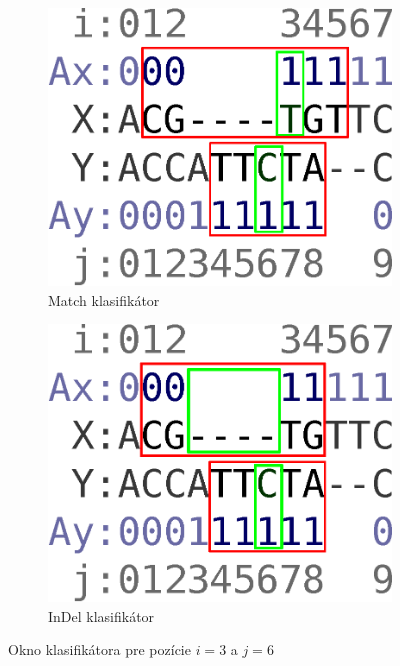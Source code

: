 \begin{figure}[hp]
        \centering
        \begin{subfigure}[b]{0.35\textwidth}
                \includegraphics[width=\textwidth]{images/window_m}
                \caption{Match klasifikátor}
                \label{fig:window-m}
        \end{subfigure}%
        \qquad\qquad %
        \begin{subfigure}[b]{0.35\textwidth}
                \includegraphics[width=\textwidth]{images/window_i}
                \caption{InDel klasifikátor}
                \label{fig:window-i}
        \end{subfigure}
        \caption{Okno klasifikátora pre pozície $i = 3$ a $j = 6$}
\end{figure}
\vspace{-1cm}

